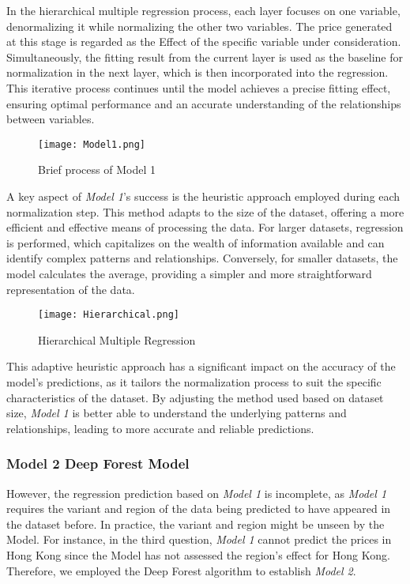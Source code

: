 \documentclass[12pt]{article}  %
\begin{document}
In the hierarchical multiple regression process, each layer focuses on one variable, denormalizing it while normalizing the other two variables. The price generated at this stage is regarded as the Effect of the specific variable under consideration. Simultaneously, the fitting result from the current layer is used as the baseline for normalization in the next layer, which is then incorporated into the regression. This iterative process continues until the model achieves a precise fitting effect, ensuring optimal performance and an accurate understanding of the relationships between variables.
\begin{figure}[htbp]
    \centering
    \texttt{[image: Model1.png]}
    \caption{Brief process of Model 1}\label{fig:Model1}
\end{figure}
A key aspect of \emph{Model 1}'s success is the heuristic approach employed during each normalization step. This method adapts to the size of the dataset, offering a more efficient and effective means of processing the data. For larger datasets, regression is performed, which capitalizes on the wealth of information available and can identify complex patterns and relationships. Conversely, for smaller datasets, the model calculates the average, providing a simpler and more straightforward representation of the data.

\begin{figure}[htbp]
    \centering
    \texttt{[image: Hierarchical.png]}
    \caption{Hierarchical Multiple Regression}\label{fig:Hierarchical}
\end{figure}

This adaptive heuristic approach has a significant impact on the accuracy of the model's predictions, as it tailors the normalization process to suit the specific characteristics of the dataset. By adjusting the method used based on dataset size, \emph{Model 1} is better able to understand the underlying patterns and relationships, leading to more accurate and reliable predictions.


\subsubsection{Model 2 \textemdash  Deep Forest Model}


However, the regression prediction based on \emph{Model 1} is incomplete, as \emph{Model 1} requires the variant and region of the data being predicted to have appeared in the dataset before. In practice, the variant and region might be unseen by the Model. For instance, in the third question, \emph{Model 1} cannot predict the prices in Hong Kong since the Model has not assessed the region's effect for Hong Kong. Therefore, we employed the Deep Forest algorithm to establish \emph{Model 2}.
\end{document}
